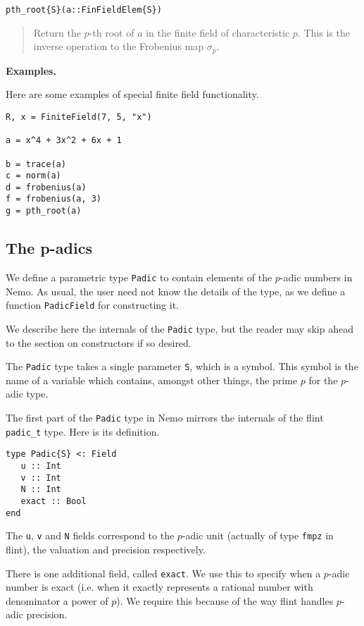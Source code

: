 \documentclass[a4paper,10pt]{article}
\newcommand{\code}{\lstinline}
\newcommand{\desc}[1]{\vspace{-3mm}\begin{quote}#1\end{quote}}
\begin{document}
{{{\begin{lstlisting}
pth_root{S}(a::FinFieldElem{S})
\end{lstlisting}

\desc{Return the $p$-th root of $a$ in the finite field of characteristic
$p$. This is the inverse operation to the Frobenius map $\sigma_p$.}

\textbf{Examples.}

Here are some examples of special finite field functionality.

\begin{lstlisting}
R, x = FiniteField(7, 5, "x")

a = x^4 + 3x^2 + 6x + 1

b = trace(a)
c = norm(a)
d = frobenius(a)
f = frobenius(a, 3)
g = pth_root(a)
\end{lstlisting}

\subsection{The p-adics}

We define a parametric type \code{Padic} to contain elements of the $p$-adic
numbers in Nemo. As usual, the user need not know the details of the type, as
we define a function \code{PadicField} for constructing it.

We describe here the internals of the \code{Padic} type, but the reader may
skip ahead to the section on constructors if so desired.

The \code{Padic} type takes a single parameter \code{S}, which is a symbol.
This symbol is the name of a variable which contains, amongst other things,
the prime $p$ for the $p$-adic type.

The first part of the \code{Padic} type in Nemo mirrors the internals of the
flint \code{padic_t} type. Here is its definition.

\begin{lstlisting}
type Padic{S} <: Field
   u :: Int 
   v :: Int
   N :: Int
   exact :: Bool
end
\end{lstlisting}

The \code{u}, \code{v} and \code{N} fields correspond to the $p$-adic unit
(actually of type \code{fmpz} in flint), the valuation and precision
respectively. 

There is one additional field, called \code{exact}. We use this to specify
when a $p$-adic number is exact (i.e. when it exactly represents a rational
number with denominator a power of $p$). We require this because of the way
flint handles $p$-adic precision.

}}}
\end{document}
